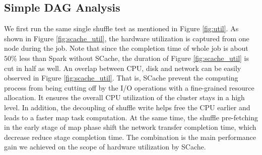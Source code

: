 \subsection{Simple DAG Analysis}
We first run the same single shuffle test as mentioned in Figure \ref{fig:util}. As shown in Figure \ref{fig:scache_util}, the hardware utilization is captured from one node during the job. Note that since the completion time of whole job is about $50\%$ less than Spark without SCache, the duration of Figure \ref{fig:scache_util} is cut in half as well. An overlap between CPU, disk and network can be easily observed in Figure \ref{fig:scache_util}. That is, SCache prevent the computing process from being cutting off by the I/O operations with a fine-grained resource allocation. It ensures the overall CPU utilization of the cluster stays in a high level. In addition, the decoupling of shuffle write helps free the CPU earlier and leads to a faster map task computation. At the same time, the shuffle pre-fetching in the early stage of map phase shift the network transfer completion time, which decrease reduce stage completion time. The combination is the main performance gain we achieved on the scope of hardware utilization by SCache.

